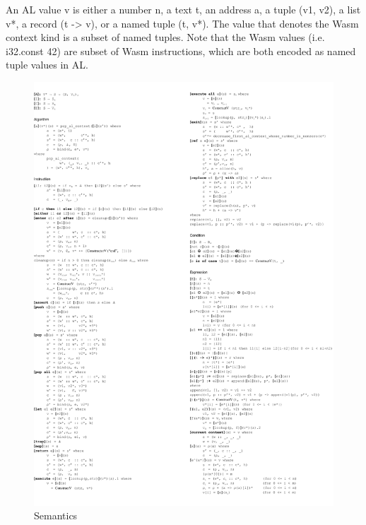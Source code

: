 An AL value v is either a number n, a text t, an address a, a tuple (v1, v2),
a list v*, a record (t -> v), or a named tuple (t, v*). The value that denotes
the Wasm context kind is a subset of named tuples. Note that the Wasm values (i.e. i32.const 42) are
subset of Wasm instructions, which are both encoded as named tuple values in AL.

\begin{figure}
  \centering
  \includegraphics[width=\textwidth]{../img/Semantics.pdf}
  \caption{Semantics}
  \label{fig:semantics}
\end{figure}

